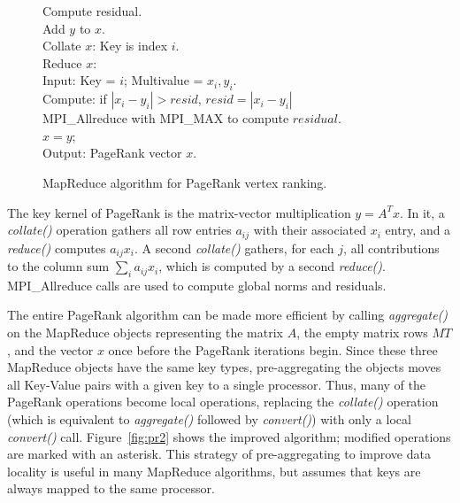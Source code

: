 \begin{figure}[htb]
\begin{center}
{\begin{minipage}{\textwidth}
\begin{tabbing}
\> Compute residual. \\
\> \> Add $y$ to $x$. \\
\> \> Collate $x$:  Key is index $i$. \\
\> \> Reduce $x$:   \\
\> \> \> Input:  Key = $i$; Multivalue = $x_i, y_i$. \\
\> \> \> Compute:  if $|x_i - y_i| > {resid}$, ${resid} = |x_i - y_i|$ \\
\> \> MPI\_Allreduce with MPI\_MAX to compute $residual$. \\
\> $x = y$; \\
Output:  PageRank vector $x$.
  \end{tabbing}
 \end{minipage}}\end{center}

 \caption{MapReduce algorithm for PageRank vertex ranking.}

 \label{fig:pr}
\end{figure}

The key kernel of PageRank is the matrix-vector multiplication $y = A^T x$.
In it, a {\it
collate()} operation gathers all row entries $a_{ij}$ with their
associated $x_i$ entry, and a {\it reduce()} computes $a_{ij} x_i$.  A
second {\it collate()} gathers, for each $j$, all contributions to the
column sum $\sum_i a_{ij} x_i$, which is computed by a second {\it
reduce()}.  MPI\_Allreduce calls are used to compute global norms and
residuals.

The entire PageRank algorithm can be made more efficient by calling
{\it aggregate()} on the MapReduce objects representing the matrix $A$, 
the empty matrix rows $MT$, and the vector $x$ once before the PageRank 
iterations begin.  Since these three MapReduce
objects have the same key types, pre-aggregating the objects moves all
Key-Value pairs with a given key to a single processor.  Thus, many of
the PageRank operations become local operations, replacing 
the {\it collate()} operation (which is equivalent to {\it aggregate()} 
followed by {\it convert()}) with only a local {\it convert()} call. 
Figure~\ref{fig:pr2} shows the
improved algorithm; modified operations are marked with an asterisk.
This strategy of pre-aggregating to improve data locality is useful in
many MapReduce algorithms, but assumes that keys are always mapped to
the same processor.

